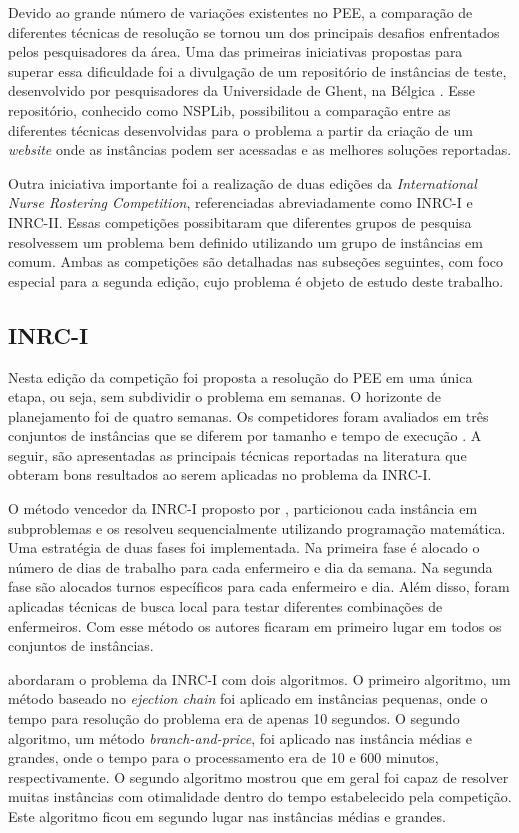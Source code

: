 \documentclass[cic,tc, twoside]{iiufrgs}
\begin{document}
Devido ao grande número de variações existentes no PEE, a comparação de diferentes técnicas de resolução se tornou um dos principais desafios enfrentados pelos pesquisadores da área. 
Uma das primeiras iniciativas propostas para superar essa dificuldade foi a divulgação de um repositório de instâncias de teste, desenvolvido por pesquisadores da Universidade de Ghent, na Bélgica \cite{vanhoucke2007nsplib}. Esse repositório, conhecido como NSPLib, possibilitou a comparação entre as diferentes técnicas desenvolvidas para o problema a partir da criação de um \textit{website} onde as instâncias podem ser acessadas e as melhores soluções reportadas.

Outra iniciativa importante foi a realização de duas edições da \textit{International Nurse Rostering Competition}, referenciadas abreviadamente como INRC-I e INRC-II. Essas competições possibitaram que diferentes grupos de pesquisa resolvessem um problema bem definido utilizando um grupo de instâncias em comum.
Ambas as competições são detalhadas nas subseções seguintes, com foco especial para a segunda edição, cujo problema é objeto de estudo deste trabalho.

\subsection{INRC-I}

Nesta edição da competição foi proposta a resolução do PEE em uma única etapa, ou seja, sem subdividir o problema em semanas. O horizonte de planejamento foi de quatro semanas.
Os competidores foram avaliados em três conjuntos de instâncias que se diferem por tamanho e tempo de execução \cite{haspeslagh2010first}.
A seguir, são apresentadas as principais técnicas reportadas na literatura que obteram bons resultados ao serem aplicadas no problema da INRC-I.

O método vencedor da INRC-I proposto por \citet{valouxis2012systematic}, particionou cada instância em subproblemas e os resolveu sequencialmente utilizando programação matemática. Uma estratégia de duas fases foi implementada.
Na primeira fase é alocado o número de dias de trabalho para cada enfermeiro e dia da semana.
Na segunda fase são alocados turnos específicos para cada enfermeiro e dia.
Além disso, foram aplicadas técnicas de busca local para testar diferentes combinações de enfermeiros. 
Com esse método os autores ficaram em primeiro lugar em todos os conjuntos de instâncias.

\citet{burke10} abordaram o problema da INRC-I com dois algoritmos.
O primeiro algoritmo, um método baseado no \textit{ejection chain} foi aplicado em instâncias pequenas, onde o tempo para resolução do problema era de apenas 10 segundos. O segundo algoritmo, um método \textit{branch-and-price}, foi aplicado nas instância médias e grandes, onde o tempo para o processamento era de 10 e 600 minutos, respectivamente. 
O segundo algoritmo mostrou que em geral foi capaz de resolver muitas instâncias com otimalidade dentro do tempo estabelecido pela competição. 
Este algoritmo ficou em segundo lugar nas instâncias médias e grandes.
\end{document}
